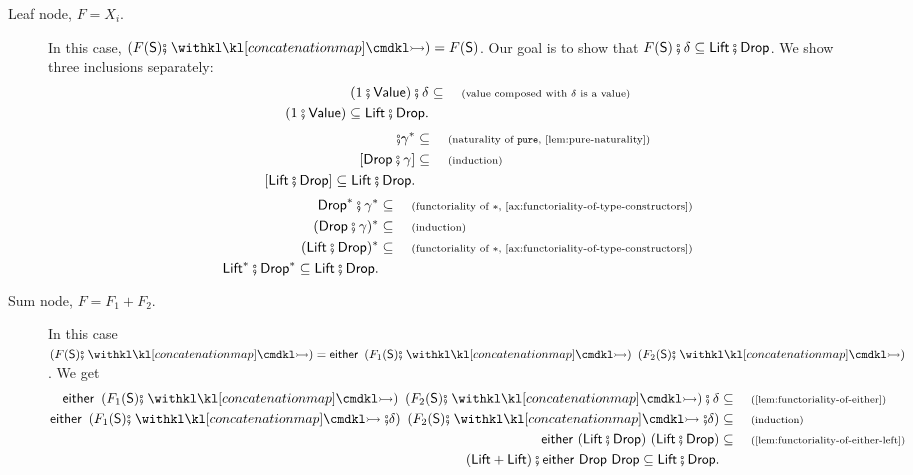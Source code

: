 \begin{description}
\begin{description}
	\item[Leaf node, $F = X_i$.] In this case, $\left( F(\mathsf{S}) \comp \concmap \right) = F(\mathsf{S})$. Our goal is to show that $F(\mathsf{S}) \comp \delta \subseteq \Lift \comp \Drop$. We show three inclusions separately:
	\begin{align*}
		(1 \comp \Value) \comp \delta &\subseteq \why{value composed with $\delta$ is a value} \\ 
		(1 \comp \Value) \subseteq \Lift \comp \Drop.
	\end{align*}
	\begin{align*}
		[\Drop] \comp \gamma^* &\subseteq \why{naturality of $\pureterm$, \cref{lem:pure-naturality}} \\ 
		[\Drop \comp \gamma] &\subseteq \why{induction} \\ 
		[\Lift \comp \Drop] \subseteq \Lift \comp \Drop.
	\end{align*}
	\begin{align*}
		\Drop^* \comp \gamma^* &\subseteq \why{functoriality of $*$, \cref{ax:functoriality-of-type-constructors}} \\ 
		(\Drop \comp \gamma)^* &\subseteq \why{induction} \\ 
		(\Lift \comp \Drop)^* &\subseteq \why{functoriality of $*$, \cref{ax:functoriality-of-type-constructors}} \\ 
		\Lift^* \comp \Drop^* \subseteq \Lift \comp \Drop.
	\end{align*}

	\item[Sum node, $F = F_1 + F_2$.] In this case $\left( F(\mathsf{S}) \comp \concmap \right) = \either{\left( F_1(\mathsf{S}) \comp \concmap \right)}{\left( F_2(\mathsf{S}) \comp \concmap \right)}$. We get
	\begin{align*}
		\either{\left( F_1(\mathsf{S}) \comp \concmap \right)}{\left( F_2(\mathsf{S}) \comp \concmap \right)} \comp \delta &\subseteq \why{\cref{lem:functoriality-of-either}} \\ 
		\either{\left( F_1(\mathsf{S}) \comp \concmap \comp \delta \right)}{\left( F_2(\mathsf{S}) \comp \concmap \comp \delta \right)} &\subseteq \why{induction} \\ 
		\either{(\Lift \comp \Drop)}{(\Lift \comp \Drop)} &\subseteq \why{\cref{lem:functoriality-of-either-left}} \\ 
		(\Lift + \Lift) \comp \either{\Drop}{\Drop} \subseteq \Lift \comp \Drop.
	\end{align*}


\end{description}
\end{description}
